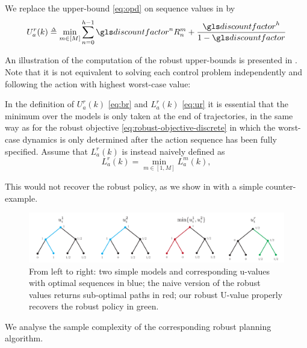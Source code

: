 \begin{definition}
	\begin{leftbar}[defnbar]
	We replace the upper-bound \eqref{eq:opd} on sequence values in \OPD by
	\begin{equation}
	\label{eq:robust-b-values}
	U_a^r(k)  \eqdef \min_{m\in[M]} \sum_{n=0}^{h-1} \discount^n R_n^m  + \frac{\discount^h}{1-\discount}
	\end{equation}
	\end{leftbar}
\end{definition}
An illustration of the computation of the robust upper-bounds is presented in . 
Note that it is not equivalent to solving each control problem independently and following the action with highest worst-case value:
\begin{remark}
	\label{sec:min-max-order}
	\begin{leftbar}[remarkbar]
	In the definition of $U_{a}^{r}(k)$ \eqref{eq:br} and $L_{a}^{r}(k)$ \eqref{eq:ur} it is essential that the minimum over the models is only taken at the end of trajectories, in the same way as for the robust objective \eqref{eq:robust-objective-discrete} in which the worst-case dynamics is only determined after the action sequence has been fully specified. Assume that $L_{a}^{r}(k)$ is instead naively defined as
	\[
	L_{a}^{r}(k)=\min_{m\in[1,M]}L_{a}^{m}(k),
	\]
	
	This would not recover the robust policy, as we show in  with a simple counter-example.
\end{leftbar}
	\begin{figure}[htp]
	\centering
	\includegraphics[width=\linewidth]{img/min-max-order}
	\caption{From left to right: two simple models and corresponding u-values with optimal sequences in blue; the naive version of the robust values returns sub-optimal paths in red; our robust U-value properly recovers the robust policy in green.}
	\label{fig:min-max-order}
	\end{figure}
\end{remark}

We analyse the sample complexity of the corresponding robust planning algorithm.

